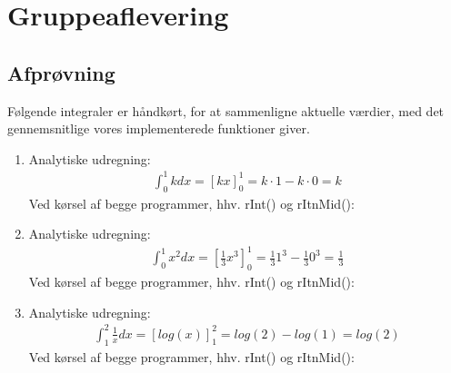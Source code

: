 \documentclass[12pt, a4paper]{article}
\begin{document}
\section*{Gruppeaflevering}
\subsection*{Afprøvning}
Følgende integraler er håndkørt, for at sammenligne aktuelle værdier, med det gennemsnitlige vores implementerede funktioner giver. 
\begin{enumerate}
\item Analytiske udregning:
\begin{eqnarray}
\int_0^1 k dx = [kx]_0^1 = k\cdot 1 - k\cdot 0 = k
\end{eqnarray}
Ved kørsel af begge programmer, hhv. rInt() og rItnMid():
\item Analytiske udregning:
\begin{eqnarray}
\int_0^1 x^2 dx = [\frac{1}{3}x^3]_0^1 = \frac{1}{3}1^3 - \frac{1}{3}0^3 = \frac{1}{3}
\end{eqnarray}
Ved kørsel af begge programmer, hhv. rInt() og rItnMid():
\item Analytiske udregning:
\begin{eqnarray}
\int_1^2 \frac{1}{x} dx = [log(x)]_1^2 = log(2) - log(1) = log(2)
\end{eqnarray}
Ved kørsel af begge programmer, hhv. rInt() og rItnMid():
\end{enumerate}
\end{document}
